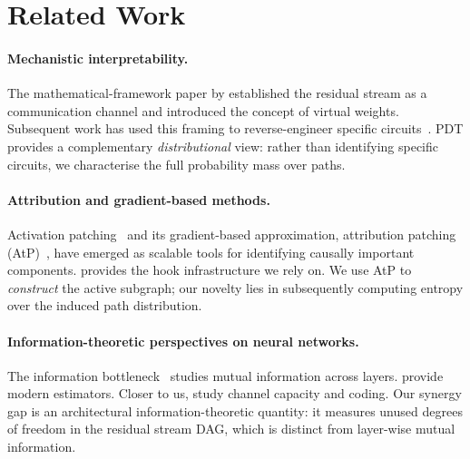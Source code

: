 \documentclass{article}
\begin{document}
\section{Related Work}
\label{sec:related}

\paragraph{Mechanistic interpretability.}
The mathematical-framework paper by \citet{elhage2021mathematical} established the
residual stream as a communication channel and introduced the concept of virtual
weights.  Subsequent work has used this framing to reverse-engineer specific
circuits~\citep{wang2022interpretability,nanda2023progress,henighan2023superposition,
meng2022locating,conmy2023automated,lieberum2023does}.  PDT provides a
complementary \emph{distributional} view: rather than identifying specific circuits,
we characterise the full probability mass over paths.

\paragraph{Attribution and gradient-based methods.}
Activation patching~\citep{pearl2001causality,vig2020investigating,meng2022locating}
and its gradient-based approximation, attribution patching
(AtP)~\citep{goldowsky2023localizing,kramar2024atp}, have emerged as scalable
tools for identifying causally important components.  \citet{nanda2022transformerlens}
provides the hook infrastructure we rely on.  We use AtP to \emph{construct} the
active subgraph; our novelty lies in subsequently computing entropy over the
induced path distribution.

\paragraph{Information-theoretic perspectives on neural networks.}
The information bottleneck~\citep{tishby2000information,tishby2015deep,saxe2019information}
studies mutual information across layers.  \citet{goldfeld2019estimating} provide
modern estimators.  Closer to us, \citet{csiszar2004information} study channel
capacity and coding.  Our synergy gap is an architectural information-theoretic
quantity: it measures unused degrees of freedom in the residual stream DAG,
which is distinct from layer-wise mutual information.
\end{document}
